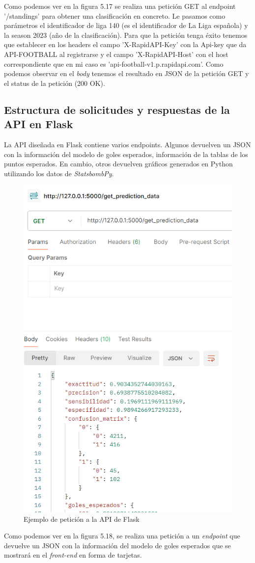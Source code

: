 Como podemos ver en la figura 5.17 se realiza una petición GET al endpoint '/standings' para obtener una clasificación en concreto. Le pasamos como parámetros el identificador de liga 140 (es el identificador de La Liga española) y la season 2023 (año de la clasificación). Para que la petición tenga éxito tenemos que establecer en los headers el campo 'X-RapidAPI-Key' con la Api-key que da API-FOOTBALL al registrarse y el campo 'X-RapidAPI-Host' con el host correspondiente que en mi caso es 'api-football-v1.p.rapidapi.com'. Como podemos observar en el \textit{body} tenemos el resultado en JSON de la petición GET y el status de la petición (200 OK).

\subsection{Estructura de solicitudes y respuestas de la API en Flask}
La API diseñada en Flask contiene varios endpoints. Algunos devuelven un JSON con la información del modelo de goles esperados, información de la tablas de los puntos esperados. En cambio, otros devuelven gráficos generados en Python utilizando los datos de \textit{StatsbombPy}.\\

\begin{figure}[H]
    \centering
    \includegraphics[width=0.5\linewidth]{img/ejemploPostmanAPIFlask.png}
    \caption{Ejemplo de petición a la API de Flask}
    \label{fig:enter-label}
\end{figure}

Como podemos ver en la figura 5.18, se realiza una petición a un \textit{endpoint} que devuelve un JSON con la información del modelo de goles esperados que se mostrará en el \textit{front-end} en forma de tarjetas.
